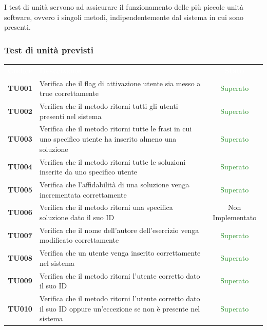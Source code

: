I test di unità servono ad assicurare il funzionamento delle più piccole unità software, ovvero i singoli metodi, indipendentemente dal sistema in cui sono presenti.

\subsubsection{Test di unità previsti}

\begin{tabularx}{\textwidth}{cXc}
	
	\rowcolor{greySWEight}
	
	\rowcolor{greySWEight}
	\textcolor{white}{\textbf{Codice}} & 
	\textcolor{white}{\textbf{Descrizione}} &
	\textcolor{white}{\textbf{Stato}} \\
	
	\textbf{TU001} & Verifica che il flag di attivazione utente sia messo a true correttamente & \textcolor{ForestGreen}{Superato} \\
	\textbf{TU002} & Verifica che il metodo ritorni tutti gli utenti presenti nel sistema & \textcolor{ForestGreen}{Superato} \\
	\textbf{TU003} & Verifica che il metodo ritorni tutte le frasi in cui uno specifico utente ha inserito almeno una soluzione & \textcolor{ForestGreen}{Superato} \\
	\textbf{TU004} & Verifica che il metodo ritorni tutte le soluzioni inserite da uno specifico utente & \textcolor{ForestGreen}{Superato} \\
	\textbf{TU005} & Verifica che l'affidabilità di una soluzione venga incrementata correttamente & \textcolor{ForestGreen}{Superato} \\
	\textbf{TU006} & Verifica che il metodo ritorni una specifica soluzione dato il suo ID & Non Implementato \\
	\textbf{TU007} & Verifica che il nome dell'autore dell'esercizio venga modificato correttamente & \textcolor{ForestGreen}{Superato} \\
	\textbf{TU008} & Verifica che un utente venga inserito correttamente nel sistema & \textcolor{ForestGreen}{Superato} \\
	\textbf{TU009} & Verifica che il metodo ritorni l'utente corretto dato il suo ID & \textcolor{ForestGreen}{Superato} \\
	\textbf{TU010} & Verifica che il metodo ritorni l'utente corretto dato il suo ID oppure un'eccezione se non è presente nel sistema & \textcolor{ForestGreen}{Superato} \\

\end{tabularx}
